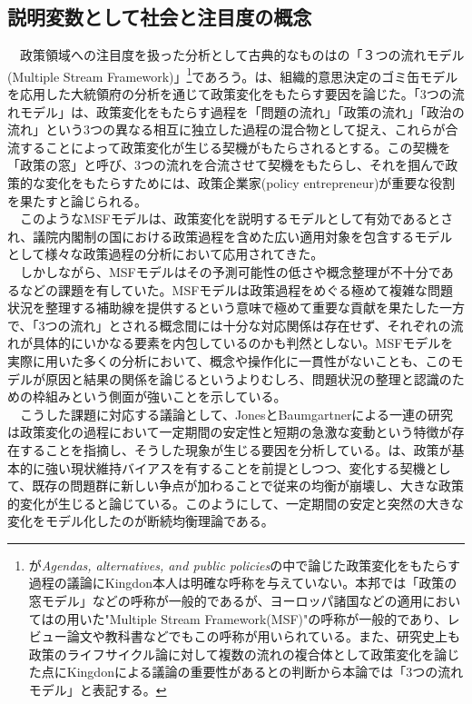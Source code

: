 \subsection{説明変数として社会と注目度の概念}
　政策領域への注目度を扱った分析として古典的なものは\citet*{Kingdon1984-oq}の「３つの流れモデル(Multiple Stream Framework)」\footnote{\citet*{Kingdon1984-oq}が\textit{Agendas, alternatives, and public policies}の中で論じた政策変化をもたらす過程の議論にKingdon本人は明確な呼称を与えていない。本邦では「政策の窓モデル」などの呼称が一般的であるが、ヨーロッパ諸国などの適用においては\citet*{Zahariadis2003-ck}の用いた"Multiple Stream Framework(MSF)"の呼称が一般的であり、レビュー論文や教科書などでもこの呼称が用いられている。また、研究史上も政策のライフサイクル論に対して複数の流れの複合体として政策変化を論じた点にKingdonによる議論の重要性があるとの判断から本論では「3つの流れモデル」と表記する。}であろう。\citet*{Kingdon1984-oq, Kingdon2013-ac}は、組織的意思決定のゴミ缶モデル\citep*{Cohen1972-ym}を応用した大統領府の分析を通じて政策変化をもたらす要因を論じた。「3つの流れモデル」は、政策変化をもたらす過程を「問題の流れ」「政策の流れ」「政治の流れ」という3つの異なる相互に独立した過程の混合物として捉え、これらが合流することによって政策変化が生じる契機がもたらされるとする。この契機を「政策の窓」と呼び、3つの流れを合流させて契機をもたらし、それを掴んで政策的な変化をもたらすためには、政策企業家(policy entrepreneur)が重要な役割を果たすと論じられる。\citep*{Kingdon1984-oq,Kingdon2013-ac}\\
　このようなMSFモデルは、政策変化を説明するモデルとして有効であるとされ、議院内閣制の国における政策過程を含めた広い適用対象を包含するモデルとして様々な政策過程の分析において応用されてきた。\citep*{Rawat2016-ew,Jones2016-lc}\\
　しかしながら、MSFモデルはその予測可能性の低さ\citep*{}や概念整理が不十分である\citep*{John2018-im}などの課題を有していた。MSFモデルは政策過程をめぐる極めて複雑な問題状況を整理する補助線を提供するという意味で極めて重要な貢献を果たした一方で、「3つの流れ」とされる概念間には十分な対応関係は存在せず、それぞれの流れが具体的にいかなる要素を内包しているのかも判然としない。MSFモデルを実際に用いた多くの分析において、概念や操作化に一貫性がない\citep*{Jones2016-lc}ことも、このモデルが原因と結果の関係を論じるというよりむしろ、問題状況の整理と認識のための枠組みという側面が強いことを示している。\\
　こうした課題に対応する議論として、JonesとBaumgartnerによる一連の研究\citep*{Baumgartner2010-rl,Baumgartner2015-ee, Baumgartner2009-eb,Jones2005-bp}は政策変化の過程において一定期間の安定性と短期の急激な変動という特徴が存在することを指摘し、そうした現象が生じる要因を分析している。\citet*{Jones2005-bp}は、政策が基本的に強い現状維持バイアスを有することを前提としつつ、変化する契機として、既存の問題群に新しい争点が加わることで従来の均衡が崩壊し、大きな政策的変化が生じると論じている。このようにして、一定期間の安定と突然の大きな変化をモデル化したのが断続均衡理論である。\\
